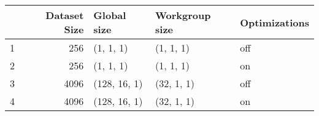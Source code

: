 \begin{tabular}{lrlll}
\toprule
{} &  Dataset Size &   Global size & Workgroup size & Optimizations \\
\midrule
1 &           256 &     (1, 1, 1) &      (1, 1, 1) &           off \\
2 &           256 &     (1, 1, 1) &      (1, 1, 1) &            on \\
3 &          4096 &  (128, 16, 1) &     (32, 1, 1) &           off \\
4 &          4096 &  (128, 16, 1) &     (32, 1, 1) &            on \\
\bottomrule
\end{tabular}
